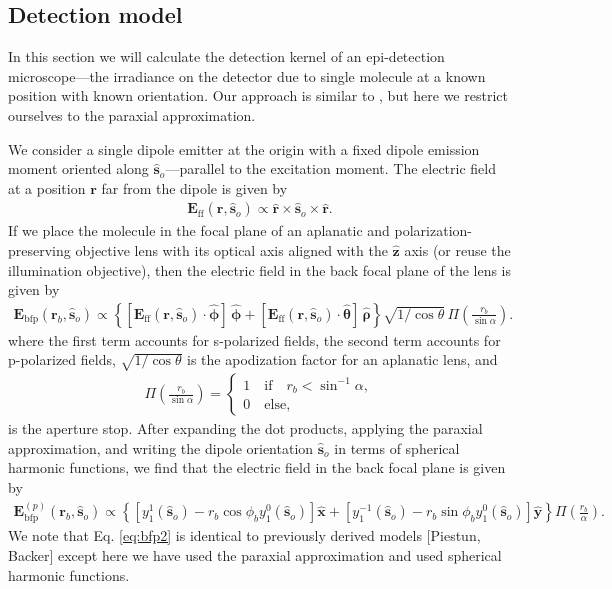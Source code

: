 \documentclass{osa-article}
\providecommand{\mb}[1]{\mathbf{#1}}
\providecommand{\so}[1]{\mathbf{\hat{s}}_o}
\providecommand{\rb}[1]{\mathbf{r}_b}
\providecommand{\mh}[1]{\mathbf{\hat{#1}}}
\providecommand{\bsh}[1]{\hat{\boldsymbol{#1}}}
\begin{document}
\subsection{Detection model}
In this section we will calculate the detection kernel of an epi-detection
microscope---the irradiance on the detector due to single molecule at a known
position with known orientation. Our approach is similar to \cite{backer2014,
  nov2006, agrawal2012}, but here we restrict ourselves to the paraxial
approximation.

We consider a single dipole emitter at the origin with a fixed dipole emission
moment oriented along $\so{}$---parallel to the excitation moment. The electric
field at a position $\mb{r}$ far from the dipole is given by
\begin{align}
  \mb{E}_{\text{ff}}(\mb{r}, \so{}) \propto \mh{r} \times \so{} \times \mh{r}. \label{eq:ff}
\end{align}
If we place the molecule in the focal plane of an aplanatic and
polarization-preserving objective lens with its optical axis aligned with the
$\mh{z}$ axis (or reuse the illumination objective), then the electric field in
the back focal plane of the lens is given by
\begin{align}
  \mb{E}_{\text{bfp}}(\rb{}, \so{}) \propto \left\{[\mb{E}_\text{ff}(\mb{r}, \so{})\cdot\bsh{\phi}]\,\bsh{\phi} + [\mb{E}_\text{ff}(\mb{r}, \so{})\cdot\bsh{\theta}]\,\bsh{\rho}\right\}\sqrt{1/\cos\theta}\,\Pi\left(\frac{r_b}{\sin\alpha}\right). \label{eq:bfp}
\end{align}
where the first term accounts for s-polarized fields, the second term accounts
for p-polarized fields, $\sqrt{1/\cos\theta}$ is the apodization factor for an
aplanatic lens, and
\begin{align}
  \Pi\left(\frac{r_b}{\sin\alpha}\right) =
  \begin{cases}
    1\quad \text{if}\quad r_b < \sin^{-1}\alpha,\\
    0\quad \text{else},
  \end{cases}
\end{align}
is the aperture stop. After expanding the dot products, applying the paraxial
approximation, and writing the dipole orientation $\so{}$ in terms of spherical
harmonic functions, we find that the electric field in the back focal plane is
given by
\begin{align}
  \mb{E}_{\text{bfp}}^{(p)}(\rb{}, \so{}) \propto \left\{\left[y_1^1(\so{}) - r_b\cos\phi_b y_1^0(\so{})\right]\mh{x} + \left[y_1^{-1}(\so{}) - r_b\sin\phi_b y_1^0(\so{})\right]\mh{y}\right\}\Pi\left(\frac{r_b}{\alpha}\right). \label{eq:bfp2}
\end{align}
We note that Eq. \ref{eq:bfp2} is identical to previously derived models
[Piestun, Backer] except here we have used the paraxial approximation and used
spherical harmonic functions.
\end{document}

